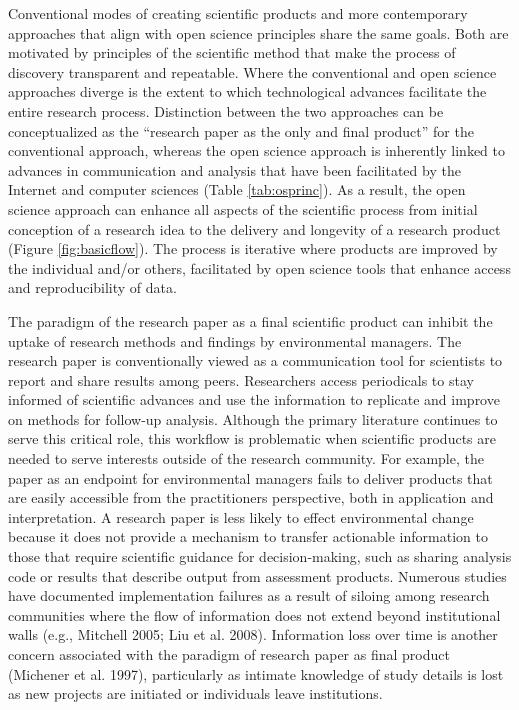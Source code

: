 \documentclass[fleqn,10pt,lineno]{wlpeerj} %
\begin{document}
Conventional modes of creating scientific products and more contemporary approaches that align with open science principles share the same goals. Both are motivated by principles of the scientific method that make the process of discovery transparent and repeatable. Where the conventional and open science approaches diverge is the extent to which technological advances facilitate the entire research process. Distinction between the two approaches can be conceptualized as the ``research paper as the only and final product'' for the conventional approach, whereas the open science approach is inherently linked to advances in communication and analysis that have been facilitated by the Internet and computer sciences (Table \ref{tab:osprinc}). As a result, the open science approach can enhance all aspects of the scientific process from initial conception of a research idea to the delivery and longevity of a research product (Figure \ref{fig:basicflow}). The process is iterative where products are improved by the individual and/or others, facilitated by open science tools that enhance access and reproducibility of data.

The paradigm of the research paper as a final scientific product can inhibit the uptake of research methods and findings by environmental managers. The research paper is conventionally viewed as a communication tool for scientists to report and share results among peers. Researchers access periodicals to stay informed of scientific advances and use the information to replicate and improve on methods for follow-up analysis. Although the primary literature continues to serve this critical role, this workflow is problematic when scientific products are needed to serve interests outside of the research community. For example, the paper as an endpoint for environmental managers fails to deliver products that are easily accessible from the practitioners perspective, both in application and interpretation. A research paper is less likely to effect environmental change because it does not provide a mechanism to transfer actionable information to those that require scientific guidance for decision-making, such as sharing analysis code or results that describe output from assessment products. Numerous studies have documented implementation failures as a result of siloing among research communities where the flow of information does not extend beyond institutional walls (e.g., Mitchell 2005; Liu et al. 2008). Information loss over time is another concern associated with the paradigm of research paper as final product (Michener et al. 1997), particularly as intimate knowledge of study details is lost as new projects are initiated or individuals leave institutions.
\end{document}
